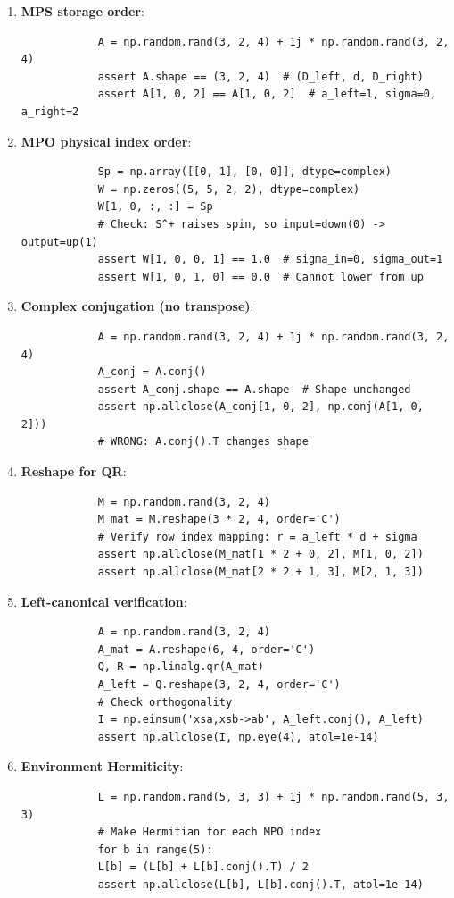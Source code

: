 \documentclass[aps,prb,onecolumn,scriptaddress]{revtex4-2}
\begin{document}
	\begin{enumerate}
		\item \textbf{MPS storage order}:
		\begin{verbatim}
			A = np.random.rand(3, 2, 4) + 1j * np.random.rand(3, 2, 4)
			assert A.shape == (3, 2, 4)  # (D_left, d, D_right)
			assert A[1, 0, 2] == A[1, 0, 2]  # a_left=1, sigma=0, a_right=2
		\end{verbatim}
		
		\item \textbf{MPO physical index order}:
		\begin{verbatim}
			Sp = np.array([[0, 1], [0, 0]], dtype=complex)
			W = np.zeros((5, 5, 2, 2), dtype=complex)
			W[1, 0, :, :] = Sp
			# Check: S^+ raises spin, so input=down(0) -> output=up(1)
			assert W[1, 0, 0, 1] == 1.0  # sigma_in=0, sigma_out=1
			assert W[1, 0, 1, 0] == 0.0  # Cannot lower from up
		\end{verbatim}
		
		\item \textbf{Complex conjugation (no transpose)}:
		\begin{verbatim}
			A = np.random.rand(3, 2, 4) + 1j * np.random.rand(3, 2, 4)
			A_conj = A.conj()
			assert A_conj.shape == A.shape  # Shape unchanged
			assert np.allclose(A_conj[1, 0, 2], np.conj(A[1, 0, 2]))
			# WRONG: A.conj().T changes shape
		\end{verbatim}
		
		\item \textbf{Reshape for QR}:
		\begin{verbatim}
			M = np.random.rand(3, 2, 4)
			M_mat = M.reshape(3 * 2, 4, order='C')
			# Verify row index mapping: r = a_left * d + sigma
			assert np.allclose(M_mat[1 * 2 + 0, 2], M[1, 0, 2])
			assert np.allclose(M_mat[2 * 2 + 1, 3], M[2, 1, 3])
		\end{verbatim}
		
		\item \textbf{Left-canonical verification}:
		\begin{verbatim}
			A = np.random.rand(3, 2, 4)
			A_mat = A.reshape(6, 4, order='C')
			Q, R = np.linalg.qr(A_mat)
			A_left = Q.reshape(3, 2, 4, order='C')
			# Check orthogonality
			I = np.einsum('xsa,xsb->ab', A_left.conj(), A_left)
			assert np.allclose(I, np.eye(4), atol=1e-14)
		\end{verbatim}
		
		\item \textbf{Environment Hermiticity}:
		\begin{verbatim}
			L = np.random.rand(5, 3, 3) + 1j * np.random.rand(5, 3, 3)
			# Make Hermitian for each MPO index
			for b in range(5):
			L[b] = (L[b] + L[b].conj().T) / 2
			assert np.allclose(L[b], L[b].conj().T, atol=1e-14)
		\end{verbatim}
	\end{enumerate}
	
\end{document}
